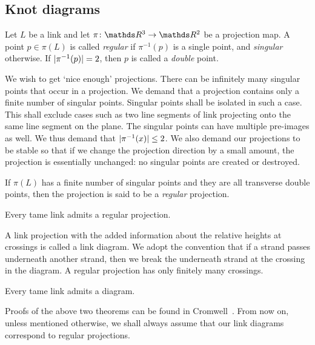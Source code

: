 \subsection{Knot diagrams}

Let \(L\) be a link and let \(\pi \colon \rthree \rightarrow \rtwo\) be a projection map. A point \(p \in \pi(L)\) is called \textit{regular} if \(\pi^{-1}(p)\) is a single point, and \textit{singular} otherwise. If \(\lvert\pi^{-1}(p)\rvert = 2\), then \(p\) is called a \textit{double} point.

We wish to get `nice enough' projections. There can be infinitely many singular points that occur in a projection. We demand that a projection contains only a finite number of singular points. Singular points shall be isolated in such a case. This shall exclude cases such as two line segments of link projecting onto the same line segment on the plane. The singular points can have multiple pre-images as well. We thus demand that \(\lvert\pi^{-1} (x)\rvert \leq 2\). We also demand our projections to be stable so that if we change the projection direction by a small amount, the projection is essentially unchanged: no singular points are created or destroyed.

\begin{defn}
    If \(\pi(L)\) has a finite number of singular points and they are all transverse double points, then the projection is said to be a \textit{regular} projection.
\end{defn}

\begin{thm}
    Every tame link admits a regular projection.
\end{thm}

A link projection with the added information about the relative heights at crossings is called a link diagram. We adopt the convention that if a strand passes underneath another strand, then we break the underneath strand at the crossing in the diagram. A regular projection has only finitely many crossings.

\begin{thm}
    Every tame link admits a diagram.
\end{thm}

Proofs of the above two theorems can be found in Cromwell~\cite[chp.~3]{cromwell}. From now on, unless mentioned otherwise, we shall always assume that our link diagrams correspond to regular projections.

